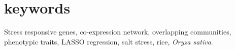 \section*{keywords}

Stress responsive genes, co-expression network, overlapping communities,
phenotypic traits, LASSO regression, salt stress, rice, \textit{Oryza sativa}.